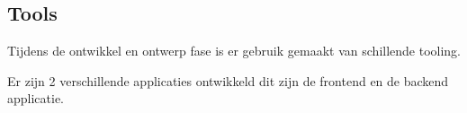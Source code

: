 \subsection{Tools}
Tijdens de ontwikkel en ontwerp fase is er gebruik gemaakt van schillende tooling.


Er zijn 2 verschillende applicaties ontwikkeld dit zijn de frontend en de backend applicatie.

